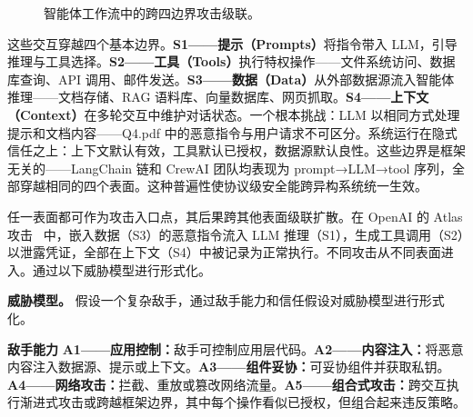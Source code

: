 \begin{figure}[t]
\caption{智能体工作流中的跨四边界攻击级联。}
\label{fig:problem}
\end{figure}


这些交互穿越四个基本边界。\textbf{S1——提示（Prompts）}将指令带入 LLM，引导推理与工具选择。\textbf{S2——工具（Tools）}执行特权操作——文件系统访问、数据库查询、API 调用、邮件发送。\textbf{S3——数据（Data）}从外部数据源流入智能体推理——文档存储、RAG 语料库、向量数据库、网页抓取。\textbf{S4——上下文（Context）}在多轮交互中维护对话状态。一个根本挑战：LLM 以相同方式处理提示和文档内容——Q4.pdf 中的恶意指令与用户请求不可区分。系统运行在隐式信任之上：上下文默认有效，工具默认已授权，数据源默认良性。这些边界是框架无关的——LangChain 链和 CrewAI 团队均表现为 prompt→LLM→tool 序列，全部穿越相同的四个表面。这种普遍性使协议级安全能跨异构系统统一生效。

任一表面都可作为攻击入口点，其后果跨其他表面级联扩散。在 OpenAI 的 Atlas 攻击~\cite{atlas-cve} 中，嵌入数据（S3）的恶意指令流入 LLM 推理（S1），生成工具调用（S2）以泄露凭证，全部在上下文（S4）中被记录为正常执行。不同攻击从不同表面进入。通过以下威胁模型进行形式化。


\noindent\textbf{威胁模型。}
\label{sec:threat-model}
假设一个复杂敌手，通过敌手能力和信任假设对威胁模型进行形式化。

\textbf{敌手能力} \textbf{A1——应用控制：}敌手可控制应用层代码。\textbf{A2——内容注入：}将恶意内容注入数据源、提示或上下文。\textbf{A3——组件妥协：}可妥协组件并获取私钥。\textbf{A4——网络攻击：}拦截、重放或篡改网络流量。\textbf{A5——组合式攻击：}跨交互执行渐进式攻击或跨越框架边界，其中每个操作看似已授权，但组合起来违反策略。


